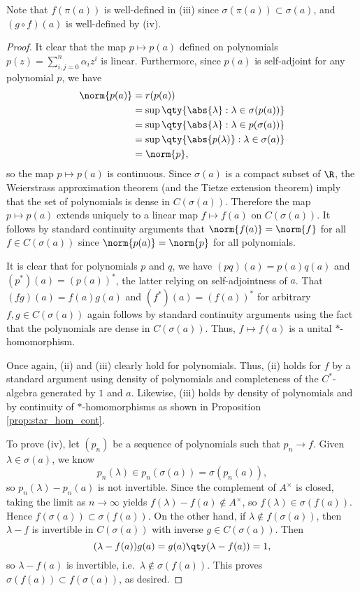 \noindent Note that $f(\pi(a))$ is well-defined in (iii) since $\sigma(\pi(a)) \subset \sigma(a)$, and $(g \circ f)(a)$ is well-defined by (iv).

\begin{proof}
It clear that the map $p \mapsto p(a)$ defined on polynomials $p(z) = \sum_{i,j=0}^n \alpha_i z^i $ is linear. Furthermore, since $p(a)$ is self-adjoint for any polynomial $p$, we have
\begin{equation}
\begin{aligned}
\norm{p(a)} &= r(p(a)) \\
&= \sup\qty{\abs{\lambda}: \lambda \in \sigma(p(a))} \\
&= \sup\qty{\abs{\lambda}: \lambda \in p(\sigma(a))} \\
&= \sup\qty{\abs{p(\lambda)}: \lambda \in \sigma(a)}\\
&= \norm{p},
\end{aligned}
\end{equation}
so the map $p \mapsto p(a)$ is continuous. Since $\sigma(a)$ is a compact subset of $\R$, the Weierstrass approximation theorem (and the Tietze extension theorem) imply that the set of polynomials is dense in $C(\sigma(a))$. Therefore the map $p \mapsto p(a)$ extends uniquely to a linear map $f \mapsto f(a)$ on $C(\sigma(a))$. It follows by standard continuity arguments that $\norm{f(a)} = \norm{f}$ for all $f \in C(\sigma(a))$ since $\norm{p(a)} = \norm{p}$ for all polynomials.

It is clear that for polynomials $p$ and $q$, we have $(pq)(a) = p(a)q(a)$ and $(p^*)(a) = (p(a))^*$, the latter relying on self-adjointness of $a$. That $(fg)(a) = f(a)g(a)$ and $(f^*)(a) = (f(a))^*$ for arbitrary $f, g \in C(\sigma(a))$ again follows by standard continuity arguments using the fact that the polynomials are dense in $C(\sigma(a))$. Thus, $f \mapsto f(a)$ is a unital $*$-homomorphism.

Once again, (ii) and (iii) clearly hold for polynomials. Thus, (ii) holds for $f$ by a standard argument using density of polynomials and completeness of the $C^*$-algebra generated by $1$ and $a$. Likewise, (iii) holds by density of polynomials and by continuity of $*$-homomorphisms as shown in Proposition \ref{prop:star_hom_cont}. 

To prove (iv), let $(p_n)$ be a sequence of polynomials such that $p_n \rightarrow f$. Given $\lambda \in \sigma(a)$, we know
\begin{equation}
p_n(\lambda) \in p_n(\sigma(a)) = \sigma(p_n(a)),
\end{equation}
so $p_n(\lambda) - p_n(a)$ is not invertible. Since the complement of $A^\times$ is closed, taking the limit as $n\rightarrow \infty$ yields $f(\lambda) - f(a) \notin A^\times$, so $f(\lambda) \in \sigma(f(a))$. Hence $f(\sigma(a)) \subset \sigma(f(a))$. On the other hand, if $\lambda \notin f(\sigma(a))$, then $\lambda - f$ is invertible in $C(\sigma(a))$ with inverse $g \in C(\sigma(a))$. Then
\begin{equation}
(\lambda - f(a))g(a) = g(a)\qty(\lambda - f(a)) = 1,
\end{equation}
so $\lambda - f(a)$ is invertible, i.e.\ $\lambda \notin \sigma(f(a))$. This proves $\sigma(f(a)) \subset f(\sigma(a))$, as desired.


\end{proof}

